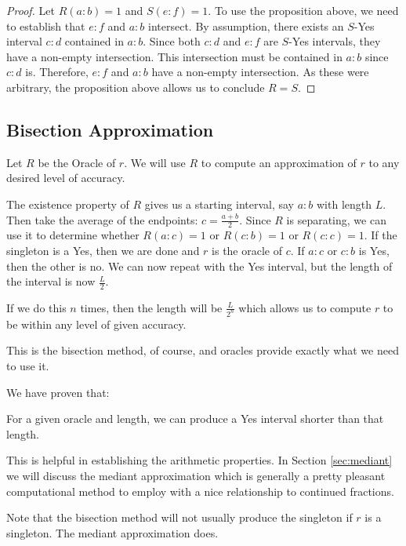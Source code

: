 \documentclass[12pt]{article}
\begin{document}
\begin{proof}
Let $R(a:b)=1$ and $S(e:f) = 1$. To use the proposition above, we need to establish that $e:f$ and $a:b$ intersect. By assumption, there exists an $S$-Yes interval $c:d$ contained in $a:b$. Since both $c:d$ and $e:f$ are $S$-Yes intervals, they have a non-empty intersection. This intersection must be contained in $a:b$ since $c:d$ is. Therefore, $e:f$ and $a:b$ have a non-empty intersection. As these were arbitrary, the proposition above allows us to conclude $R=S$.
\end{proof}


\subsection{Bisection Approximation}

Let $R$ be the Oracle of $r$. We will use $R$ to compute an approximation of $r$ to any desired level of accuracy. 

The existence property of $R$ gives us a starting interval, say $a:b$ with length $L$. Then take the average of the endpoints: $c = \frac{a+b}{2}$. Since $R$ is separating, we can use it to determine whether $R(a:c) = 1$ or $R(c:b) = 1$ or $R(c:c) = 1$. If the singleton is a Yes, then we are done and $r$  is the oracle of $c$. If $a:c$ or $c:b$ is Yes, then the other is no. We can now repeat with the Yes interval, but the length of the interval is now $\frac{L}{2}$. 

If we do this $n$ times, then the length will be $\frac{L}{2^n}$ which allows us to compute $r$ to be within any level of given accuracy. 

This is the bisection method, of course, and oracles provide exactly what we need to use it. 

We have proven that: 

\begin{proposition}\label{pr:short}
For a given oracle and length, we can produce a Yes interval shorter than that length. 
\end{proposition}

This is helpful in establishing the arithmetic properties. In Section \ref{sec:mediant} we will discuss the mediant approximation which is generally a pretty pleasant computational method to employ with a nice relationship to continued fractions. 

Note that the bisection method will not usually produce the singleton if $r$ is a singleton. The mediant approximation does. 
\end{document}
